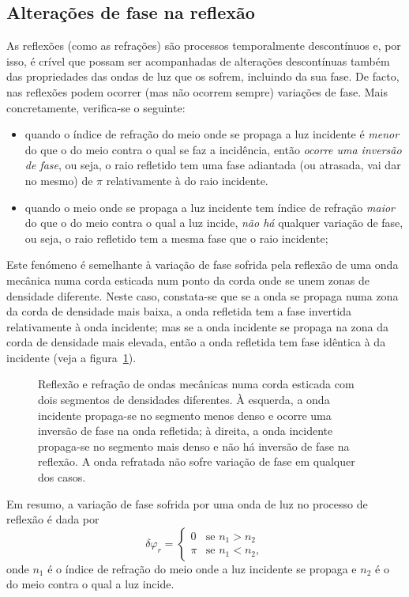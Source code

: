 \subsection*{Alterações de fase na reflexão}
As reflexões (como as refrações) são processos temporalmente descontínuos e,
por isso, é crível que possam ser acompanhadas de alterações descontínuas também
das propriedades das ondas de luz que os sofrem, incluindo da sua fase. De
facto, nas reflexões podem ocorrer (mas não ocorrem sempre) variações de fase.
Mais concretamente, verifica-se o seguinte:
\begin{itemize}
\item
    quando o índice de refração do meio onde se propaga a luz incidente é
    \emph{menor} do que o do meio contra o qual se faz a incidência, então
    \emph{ocorre uma inversão de fase}, ou seja, o raio refletido tem uma fase
    adiantada (ou atrasada, vai dar no mesmo) de $\pi$ relativamente à do raio
    incidente.
\item
    quando o meio onde se propaga a luz incidente tem índice de refração
    \emph{maior} do que o do meio contra o qual a luz incide, \emph{não há}
    qualquer variação de fase, ou seja, o raio refletido tem a mesma fase que o
    raio incidente;
\end{itemize}

Este fenómeno é semelhante à variação de fase sofrida pela reflexão de uma onda
mecânica numa corda esticada num ponto da corda onde se unem zonas de densidade
diferente. Neste caso, constata-se que se a onda se propaga numa zona da corda
de densidade mais baixa, a onda refletida tem a fase invertida relativamente à
onda incidente; mas se a onda incidente se propaga na zona da corda de densidade
mais elevada, então a onda refletida tem fase idêntica à da incidente (veja a
figura~\ref{fig:40-060}).
\begin{figure}[htb]
{\centering

\caption{Reflexão e refração de ondas mecânicas numa corda esticada com dois
segmentos de densidades diferentes. À esquerda, a onda incidente propaga-se no
segmento menos denso e ocorre uma inversão de fase na onda refletida; à direita,
a onda incidente propaga-se no segmento mais denso e não há inversão de fase na
reflexão. A onda refratada não sofre variação de fase em qualquer dos
casos.\label{fig:40-060}}

}
\end{figure}

Em resumo, a variação de fase sofrida por uma onda de luz no processo de
reflexão é dada por
\begin{equation*}
\delta\varphi_r = 
\begin{cases}
    0&\text{se } n_1>n_2\\
    \pi&\text{se } n_1<n_2,
\end{cases}
\end{equation*}
onde $n_1$ é o índice de refração do meio onde a luz incidente se propaga e
$n_2$ é o do meio contra o qual a luz incide.


